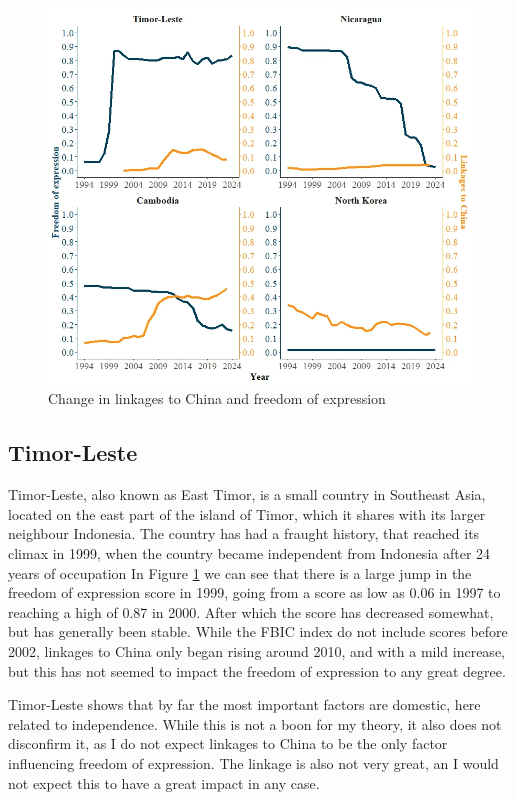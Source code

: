 \begin{figure}[H]
    \centering
    \includegraphics[width=\linewidth]{graphics/single_country_plots.jpeg}
    \caption{Change in linkages to China and freedom of expression}
    \label{fig:scp}
\end{figure}


\subsection{Timor-Leste}
Timor-Leste, also known as East Timor, is a small country in Southeast Asia, located on the east part of the island of Timor, which it shares with its larger neighbour Indonesia. The country has had a fraught history, that reached its climax in 1999, when the country became independent from Indonesia after 24 years of occupation \citep[p. 183]{kingsbury_democratic_2014} In Figure \ref{fig:scp} we can see that there is a large jump in the freedom of expression score in 1999, going from a score as low as 0.06 in 1997 to reaching a high of 0.87 in 2000. After which the score has decreased somewhat, but has generally been stable. While the FBIC index do not include scores before 2002, linkages to China only began rising around 2010, and with a mild increase, but this has not seemed to impact the freedom of expression to any great degree.

Timor-Leste shows that by far the most important factors are domestic, here related to independence. While this is not a boon for my theory, it also does not disconfirm it, as I do not expect linkages to China to be the only factor influencing freedom of expression. The linkage is also not very great, an I would not expect this to have a great impact in any case.

